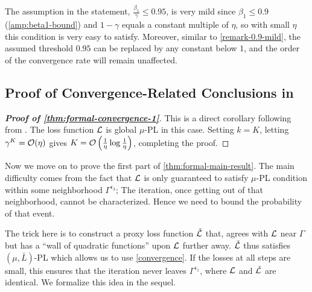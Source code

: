 \begin{remark}\label{remark-0.95-mild}
    The assumption in the statement, $\frac{\beta_1}{\gamma} \leq 0.95$, is very mild since $\beta_1 \leq 0.9$ (\cref{amp:beta1-bound}) and $1-\gamma$ equals a constant multiple of $\eta$, so with small $\eta$ this condition is very easy to satisfy. Moreover, similar to \cref{remark-0.9-mild}, the assumed threshold $0.95$ can be replaced by any constant below $1$, and the order of the convergence rate will remain unaffected.
\end{remark}




\subsection{Proof of Convergence-Related Conclusions in }\label{app:proof-formal-statement}
\begin{proof}[\textbf{Proof of \cref{thm:formal-convergence-1}}]\label{proof-formal-main-result}
This is a direct corollary following from
 . The loss function $\mathcal{L}$ is global $\mu$-PL in this case. Setting $k=K$, letting $\gamma^{K} = \mathcal{O}(\eta)$ gives $K = \mathcal{O}\left(\frac{1}{\eta}\log\frac{1}{\eta}\right)$, completing the proof.
\end{proof}

Now we move on to prove the first part of \cref{thm:formal-main-result}. The main difficulty comes from the fact that $\mathcal{L}$ is only guaranteed to satisfy $\mu$-PL condition within some neighborhood $\Gamma^{\epsilon_3}$; The iteration, once getting out of that neighborhood, cannot be characterized. Hence we need to bound the probability of that event.

The trick here is to construct a proxy loss function $\tilde{\mathcal{L}}$ that, agrees with $\mathcal{L}$ near $\Gamma$ but has a ``wall of quadratic functions'' upon $\mathcal{L}$ further away. $\tilde{\mathcal{L}}$ thus satisfies $(\mu, \bar{L})$-PL which allows us to use \cref{convergence}. If the losses at all steps are small, this ensures that the iteration never leaves $\Gamma^{\epsilon_1}$, where $\mathcal{L}$ and $\tilde{\mathcal{L}}$ are identical. We formalize this idea in the sequel.


